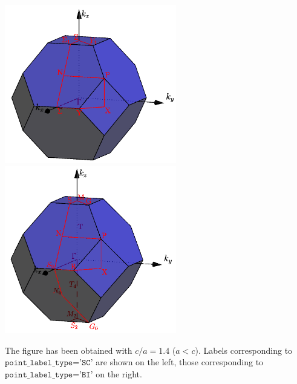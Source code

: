 \documentclass[12pt,a4paper]{article}
\begin{document}
\begin{center}
\includegraphics[width=7.5cm,angle=0]{images/stc2_sc.png} \hspace{1cm}
\includegraphics[width=7.5cm,angle=0]{images/stc2.png}
\end{center}
The figure has been obtained with $c/a=1.4$ ($a<c$).
Labels corresponding to $\texttt{point\_label\_type='SC'}$ are shown on the left,
those corresponding to $\texttt{point\_label\_type='BI'}$ on the right.
\end{document}
